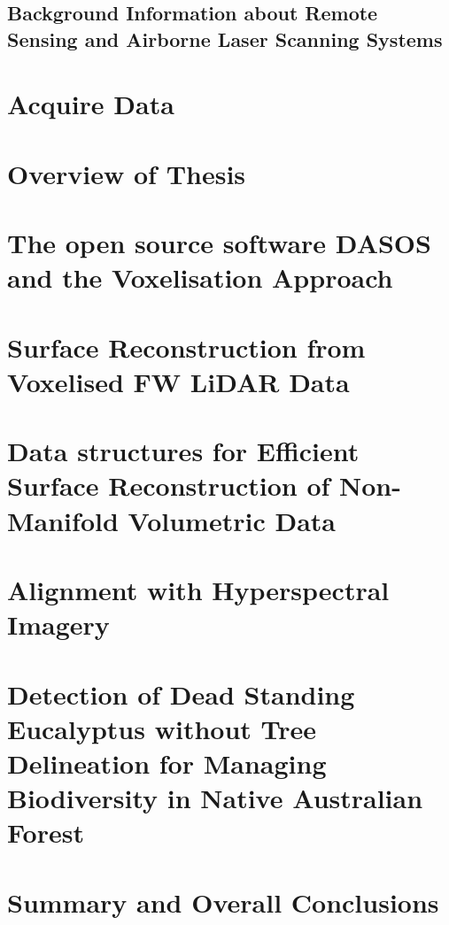 \documentclass[11pt,nofootinbib]{report}
\begin{document}
		\section{Background Information about Remote Sensing and Airborne Laser Scanning Systems}\label{Background}
			
			\newpage
		
    \chapter{Acquire Data}\label{AcquireData}
		 
	    \newpage
	\chapter{Overview of Thesis}\label{PipeLine}
		

	\chapter{The open source software DASOS and the Voxelisation Approach}\label{DASOS_Voxelisation}
			
	\newpage


		 		
	\chapter{Surface Reconstruction from Voxelised FW LiDAR Data}\label{Visualisations}
		

		\newpage
    \chapter{Data structures for Efficient Surface Reconstruction of Non-Manifold Volumetric Data}\label{Optimisations}
      
			 \newpage
	\chapter{Alignment with Hyperspectral Imagery}\label{Alignment}
		
		\newpage		
	\chapter{Detection of Dead Standing Eucalyptus without Tree Delineation for Managing Biodiversity in Native Australian Forest}\label{Classifications}
		
		\newpage
	\chapter{Summary and Overall Conclusions}\label{Conclusions}
		
		\newpage
		
\end{document}
